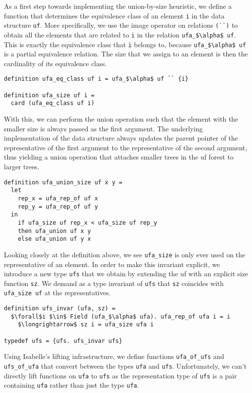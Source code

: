 \documentclass[
  sigplan,
  10pt,
  anonymous,
  review,
  ]{acmart}
\newcommand{\opunion}{union}
\begin{document}
As a first step towards implementing the union-by-size heuristic, we define a function that determines the equivalence class of an element \lstinline|i| in the data structure \lstinline|uf|.
More specifically, we use the image operator on relations \lstinline|(``)| to obtain all the elements that are related to \lstinline|i| in the relation \lstinline|ufa_$\alpha$ uf|.
This is exactly the equivalence class that \lstinline|i| belongs to, because \lstinline|ufa_$\alpha$ uf| is a partial equivalence relation.
The size that we assign to an element is then the cardinality of its equivalence class.
\begin{lstlisting}
definition ufa_eq_class uf i = ufa_$\alpha$ uf `` {i}

definition ufa_size uf i =
  card (ufa_eq_class uf i)
\end{lstlisting}
With this, we can perform the \opunion{} operation such that the element with the smaller size is always passed as the first argument. 
The underlying implementation of the data structure always updates the parent pointer of the representative of the first argument to the representative of the second argument,
thus yielding a \opunion{} operation that attaches smaller trees in the \acrshort{uf} forest to larger trees.
\begin{lstlisting}
definition ufa_union_size uf x y =
  let
    rep_x = ufa_rep_of uf x
    rep_y = ufa_rep_of uf y
  in
    if ufa_size uf rep_x < ufa_size uf rep_y
    then ufa_union uf x y
    else ufa_union uf y x
\end{lstlisting}
Looking closely at the definition above, we see \lstinline|ufa_size| is only ever used on the representative of an element.
In order to make this invariant explicit, we introduce a new type \lstinline|ufs| that we obtain by extending the \acrshort{uf} with an explicit size function \lstinline|sz|.
We demand as a type invariant of \lstinline|ufs| that \lstinline|sz| coincides with \lstinline|ufa_size uf| at the representatives.
\begin{lstlisting}
definition ufs_invar (ufa, sz) =
  $\forall$i $\in$ Field (ufa_$\alpha$ ufa). ufa_rep_of ufa i = i
    $\longrightarrow$ sz i = ufa_size ufa i

typedef ufs = {ufs. ufs_invar ufs}
\end{lstlisting}
Using Isabelle's lifting infrastructure, we define functions \lstinline|ufa_of_ufs| and \lstinline|ufs_of_ufa| that convert between the types \lstinline|ufa| and \lstinline|ufs|.
Unfortunately, we can't directly lift functions on \lstinline|ufa| to \lstinline|ufs| as the representation type of \lstinline|ufs| is a pair containing \lstinline|ufa| rather than just the type \lstinline|ufa|.
\end{document}
